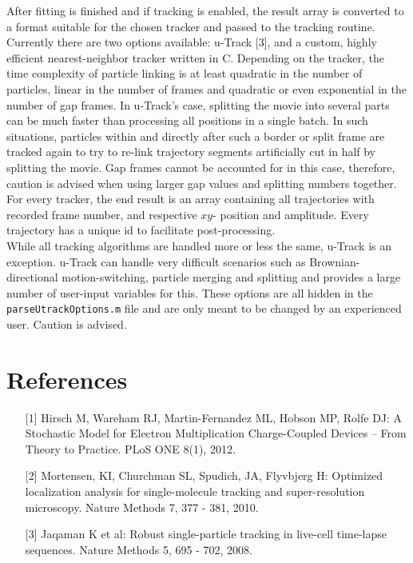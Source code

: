 \documentclass[11pt,onside]{report}
\numberwithin{equation}{chapter}
\def\CC{{C\nolinebreak[4]\hspace{-.05em}\raisebox{.4ex}{\tiny\bf ++}}}
\begin{document}
 After fitting is finished and if tracking is enabled, the result array is converted to a format suitable for the chosen tracker and passed to the tracking routine. Currently there are two options available: u-Track [3], and a custom, highly efficient nearest-neighbor tracker written in \CC. Depending on the tracker, the time complexity of particle linking is at least quadratic in the number of particles, linear in the number of frames and quadratic or even exponential in the number of gap frames. In u-Track's case, splitting the movie into several parts can be much faster than processing all positions in a single batch. In such situations, particles within and directly after such a border or split frame are tracked again to try to re-link trajectory segments artificially cut in half by splitting the movie. Gap frames cannot be accounted for in this case, therefore, caution is advised when using larger gap values and splitting numbers together.\\
For every tracker, the end result is an array containing all trajectories with recorded frame number, and respective $xy$- position and amplitude. Every trajectory has a unique id to facilitate post-processing. \\
While all tracking algorithms are handled more or less the same, u-Track is an exception. u-Track can handle very difficult scenarios such as Brownian-directional motion-switching, particle merging and splitting and provides a large number of user-input variables for this. These options are all hidden in the \texttt{parseUtrackOptions.m} file and are only meant to be changed by an experienced user. Caution is advised.




\section{References}
\begin{itemize}
\item [{[1]}]  Hirsch M, Wareham RJ, Martin-Fernandez ML, Hobson MP, Rolfe DJ: A Stochastic Model for Electron Multiplication Charge-Coupled Devices – From Theory to Practice. PLoS ONE 8(1), 2012.
\item [{[2]}] Mortensen, KI, Churchman SL, Spudich, JA, Flyvbjerg H: Optimized localization analysis for single-molecule tracking and super-resolution microscopy. Nature Methods 7, 377 - 381, 2010.
\item [{[3]}] Jaqaman K et al: Robust single-particle tracking in live-cell time-lapse sequences. Nature Methods 5, 695 - 702, 2008.

\end{itemize}
\end{document}
